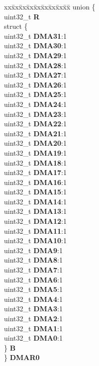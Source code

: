\begin{DoxyCompactItemize}
\begin{tabbing}
\end{tabbing}\item 
\mbox{\label{structADC__tag_adae15b774b0203207e3eb461647040f8}} 
\begin{tabbing}
xx\=xx\=xx\=xx\=xx\=xx\=xx\=xx\=xx\=\kill
union \{\\
\>uint32\_t {\bfseries R}\\
\>struct \{\\
\>\>uint32\_t {\bfseries DMA31}:1\\
\>\>uint32\_t {\bfseries DMA30}:1\\
\>\>uint32\_t {\bfseries DMA29}:1\\
\>\>uint32\_t {\bfseries DMA28}:1\\
\>\>uint32\_t {\bfseries DMA27}:1\\
\>\>uint32\_t {\bfseries DMA26}:1\\
\>\>uint32\_t {\bfseries DMA25}:1\\
\>\>uint32\_t {\bfseries DMA24}:1\\
\>\>uint32\_t {\bfseries DMA23}:1\\
\>\>uint32\_t {\bfseries DMA22}:1\\
\>\>uint32\_t {\bfseries DMA21}:1\\
\>\>uint32\_t {\bfseries DMA20}:1\\
\>\>uint32\_t {\bfseries DMA19}:1\\
\>\>uint32\_t {\bfseries DMA18}:1\\
\>\>uint32\_t {\bfseries DMA17}:1\\
\>\>uint32\_t {\bfseries DMA16}:1\\
\>\>uint32\_t {\bfseries DMA15}:1\\
\>\>uint32\_t {\bfseries DMA14}:1\\
\>\>uint32\_t {\bfseries DMA13}:1\\
\>\>uint32\_t {\bfseries DMA12}:1\\
\>\>uint32\_t {\bfseries DMA11}:1\\
\>\>uint32\_t {\bfseries DMA10}:1\\
\>\>uint32\_t {\bfseries DMA9}:1\\
\>\>uint32\_t {\bfseries DMA8}:1\\
\>\>uint32\_t {\bfseries DMA7}:1\\
\>\>uint32\_t {\bfseries DMA6}:1\\
\>\>uint32\_t {\bfseries DMA5}:1\\
\>\>uint32\_t {\bfseries DMA4}:1\\
\>\>uint32\_t {\bfseries DMA3}:1\\
\>\>uint32\_t {\bfseries DMA2}:1\\
\>\>uint32\_t {\bfseries DMA1}:1\\
\>\>uint32\_t {\bfseries DMA0}:1\\
\>\} {\bfseries B}\\
\} {\bfseries DMAR0}\\


\end{tabbing}
\end{DoxyCompactItemize}
